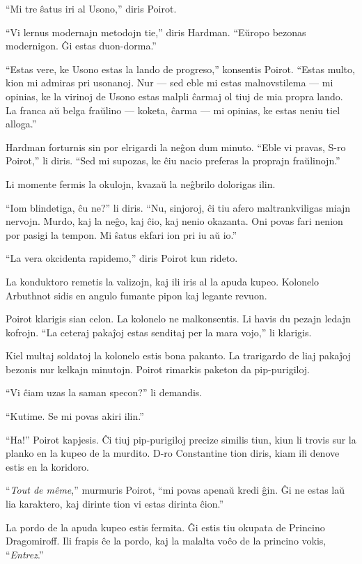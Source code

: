 ``Mi tre ŝatus iri al Usono,'' diris Poirot.

``Vi lernus modernajn metodojn tie,'' diris Hardman. ``Eŭropo bezonas modernigon. Ĝi estas duon-dorma.''

``Estas vere, ke Usono estas la lando de progreso,'' konsentis Poirot. ``Estas multo, kion mi admiras pri usonanoj. Nur --- sed eble mi estas malnovstilema --- mi opinias, ke la virinoj de Usono estas malpli ĉarmaj ol tiuj de mia propra lando. La franca aŭ belga fraŭlino --- koketa, ĉarma --- mi opinias, ke estas neniu tiel alloga.''

Hardman forturnis sin por elrigardi la neĝon dum minuto. ``Eble vi pravas, S-ro Poirot,'' li diris. ``Sed mi supozas, ke ĉiu nacio preferas la proprajn fraŭlinojn.''

Li momente fermis la okulojn, kvazaŭ la neĝbrilo dolorigas ilin.

``Iom blindetiga, ĉu ne?'' li diris. ``Nu, sinjoroj, ĉi tiu afero maltrankviligas miajn nervojn. Murdo, kaj la neĝo, kaj ĉio, kaj nenio okazanta. Oni povas fari nenion por pasigi la tempon. Mi ŝatus ekfari ion pri iu aŭ io.''

``La vera okcidenta rapidemo,'' diris Poirot kun rideto.

La konduktoro remetis la valizojn, kaj ili iris al la apuda kupeo. Kolonelo Arbuthnot sidis en angulo fumante pipon kaj legante revuon.

Poirot klarigis sian celon. La kolonelo ne malkonsentis. Li havis du pezajn ledajn kofrojn. ``La ceteraj pakaĵoj estas senditaj per la mara vojo,'' li klarigis.

Kiel multaj soldatoj la kolonelo estis bona pakanto. La trarigardo de liaj pakaĵoj bezonis nur kelkajn minutojn. Poirot rimarkis paketon da pip-purigiloj.

``Vi ĉiam uzas la saman specon?'' li demandis.

``Kutime. Se mi povas akiri ilin.''

``Ha!'' Poirot kapjesis. Ĉi tiuj pip-purigiloj precize similis tiun, kiun li trovis sur la planko en la kupeo de la murdito. D-ro Constantine tion diris, kiam ili denove estis en la koridoro.

``\emph{Tout de même},'' murmuris Poirot, ``mi povas apenaŭ kredi ĝin. Ĝi ne estas laŭ lia karaktero, kaj dirinte tion vi estas dirinta ĉion.''

La pordo de la apuda kupeo estis fermita. Ĝi estis tiu okupata de Princino Dragomiroff. Ili frapis ĉe la pordo, kaj la malalta voĉo de la princino vokis, ``\emph{Entrez}.''

